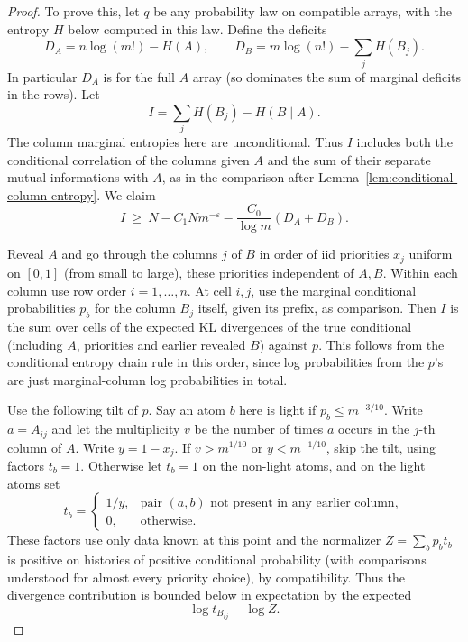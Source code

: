 \begin{proof}\label{tra:tilted-arrays:weighted-proof}
\label{tra:tilted-arrays:tilted-entropy-proof}
To prove this, let \(q\) be any probability law on compatible arrays, with the entropy \(H\) below computed in this law. Define the deficits
\[
D_A=n\log(m!)-H(A),
\qquad
D_B=m\log(n!)-\sum_j H(B_j).
\]
In particular \(D_A\) is for the full \(A\) array (so dominates the sum of marginal deficits in the rows). Let
\[
I=\sum_j H(B_j)-H(B\mid A).
\]
The column marginal entropies here are unconditional. Thus $I$ includes
both the conditional correlation of the columns given $A$ and the sum
of their separate mutual informations with $A$, as in the comparison
after Lemma~\ref{lem:conditional-column-entropy}.
We claim
\begin{equation}
 I\ \ge\ N-C_1N m^{-\varepsilon}
             -\frac{C_0}{\log m}(D_A+D_B). \label{tra:tilted-arrays:eq3}
\end{equation}

Reveal \(A\) and go through the columns \(j\) of \(B\) in order of iid priorities \(x_j\) uniform on \([0,1]\) (from small to large), these priorities independent of \(A,B\). Within each column use row order \(i=1,\dots,n\). At cell \(i,j\), use the marginal conditional probabilities
\(p_b\) for the column \(B_j\) itself, given its prefix, as comparison. Then \(I\) is the sum over cells of the expected KL divergences of the true conditional (including \(A\), priorities and earlier revealed \(B\)) against \(p\). This follows from the conditional entropy chain rule in this order, since log probabilities from the \(p\)'s are just marginal-column log probabilities in total.

Use the following tilt of \(p\). Say an atom \(b\) here is light if \(p_b\le m^{-3/10}\). Write \(a=A_{ij}\) and let the multiplicity \(v\) be the number of times \(a\) occurs in the \(j\)-th column of \(A\). Write \(y=1-x_j\). If \(v>m^{1/10}\) or \(y<m^{-1/10}\), skip the tilt, using factors \(t_b=1\). Otherwise let \(t_b=1\) on the non-light atoms, and on the light atoms set
\[
 t_b=
 \begin{cases}
  1/y, & \text{pair }(a,b)\text{ not present in any earlier column},\\
  0, &\text{otherwise}.
 \end{cases}
\]
These factors use only data known at this point and the normalizer \(Z=\sum_b p_b t_b\) is positive on histories of positive conditional probability (with comparisons understood for almost every priority choice), by compatibility. Thus the divergence contribution is bounded below in expectation by the expected
\[
 \log t_{B_{ij}}-\log Z.
\]


\end{proof}
